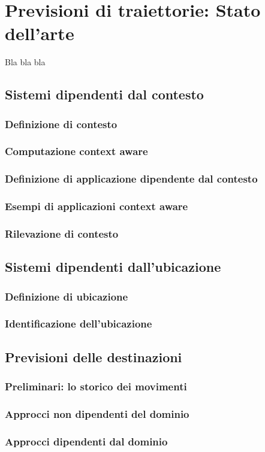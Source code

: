 \chapter{Previsioni di traiettorie: Stato dell'arte}
Bla bla bla

\section{Sistemi dipendenti dal contesto}

\subsection{Definizione di contesto}

\subsection{Computazione context aware}

\subsection{Definizione di applicazione dipendente dal contesto}

\subsection{Esempi di applicazioni context aware}

\subsection{Rilevazione di contesto}

\section{Sistemi dipendenti dall'ubicazione}

\subsection{Definizione di ubicazione}

\subsection{Identificazione dell'ubicazione}

\section{Previsioni delle destinazioni}

\subsection{Preliminari: lo storico dei movimenti}

\subsection{Approcci non dipendenti del dominio}

\subsection{Approcci dipendenti dal dominio}
